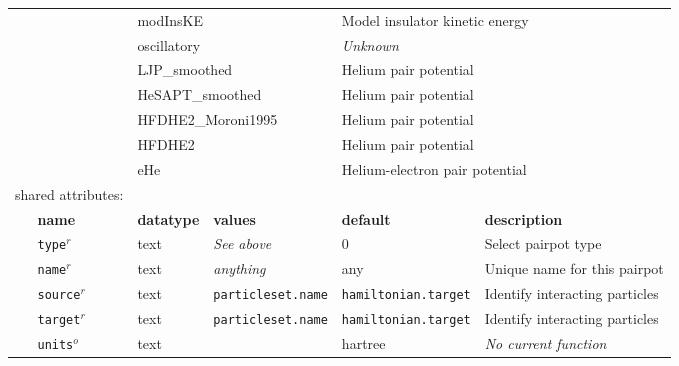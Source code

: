 \begin{table}[h]
\begin{center}
\begin{tabularx}{\textwidth}{l l l l l l }
\multicolumn{2}{l}{                } & \multicolumn{2}{l}{modInsKE          } & \multicolumn{2}{l}{Model insulator kinetic energy}\\
\multicolumn{2}{l}{                } & \multicolumn{2}{l}{oscillatory       } & \multicolumn{2}{l}{\textit{Unknown}}\\
\multicolumn{2}{l}{                } & \multicolumn{2}{l}{LJP\_smoothed     } & \multicolumn{2}{l}{Helium pair potential}\\
\multicolumn{2}{l}{                } & \multicolumn{2}{l}{HeSAPT\_smoothed  } & \multicolumn{2}{l}{Helium pair potential}\\
\multicolumn{2}{l}{                } & \multicolumn{2}{l}{HFDHE2\_Moroni1995} & \multicolumn{2}{l}{Helium pair potential}\\
\multicolumn{2}{l}{                } & \multicolumn{2}{l}{HFDHE2            } & \multicolumn{2}{l}{Helium pair potential}\\
\multicolumn{2}{l}{                } & \multicolumn{2}{l}{eHe               } & \multicolumn{2}{l}{Helium-electron pair potential}\\
\multicolumn{2}{l}{shared attributes:} & \multicolumn{4}{l}{}\\
   &   \bfseries name     & \bfseries datatype & \bfseries values & \bfseries default   & \bfseries description \\
   &   \texttt{type}$^r$      &  text              & \textit{See above}        & 0                   & Select pairpot type         \\
   &   \texttt{name}$^r$      &  text              & \textit{anything}         & any                 & Unique name for this pairpot\\
   &   \texttt{source}$^r$    &  text              & \texttt{particleset.name} &\texttt{hamiltonian.target}& Identify interacting particles\\
   &   \texttt{target}$^r$    &  text              & \texttt{particleset.name} &\texttt{hamiltonian.target}& Identify interacting particles  \\
   &   \texttt{units}$^o$     &  text              &                           & hartree             & \textit{No current function}  \\
\hline
\end{tabularx}
\end{center}
\end{table}
\FloatBarrier


